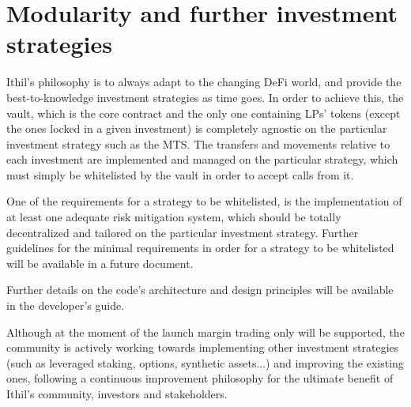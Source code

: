 \documentclass [10pt, fancyhdr, twoside] {article}
\begin{document}
\section{Modularity and further investment strategies}

Ithil's philosophy is to always adapt to the changing DeFi world, and provide the best-to-knowledge investment strategies as time goes. In order to achieve this, the vault, which is the core contract and the only one containing LPs' tokens (except the ones locked in a given investment) is completely agnostic on the particular investment strategy such as the MTS. The transfers and movements relative to each investment are implemented and managed on the particular strategy, which must simply be whitelisted by the vault in order to accept calls from it. 

One of the requirements for a strategy to be whitelisted, is the implementation of at least one adequate risk mitigation system, which should be totally decentralized and tailored on the particular investment strategy. Further guidelines for the minimal requirements in order for a strategy to be whitelisted will be available in a future document.

Further details on the code's architecture and design principles will be available in the developer's guide.

Although at the moment of the launch margin trading only will be supported, the community is actively working towards implementing other investment strategies (such as leveraged staking, options, synthetic assets...) and improving the existing ones, following a continuous improvement philosophy for the ultimate benefit of Ithil's community, investors and stakeholders.
\end{document}
